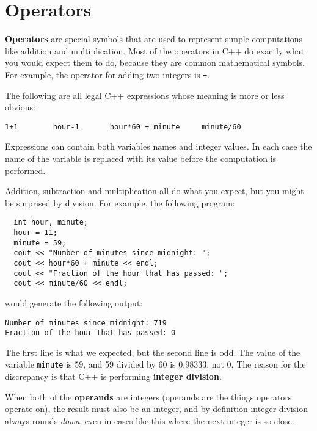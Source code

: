 \section{Operators}

{\bf Operators} are special symbols that are used to represent
simple computations like addition and multiplication.  Most
of the operators in C++ do exactly what you would expect them
to do, because they are common mathematical symbols.  For
example, the operator for adding two integers is {\tt +}.

The following are all legal C++ expressions whose meaning is
more or less obvious:

\begin{verbatim}
1+1        hour-1       hour*60 + minute     minute/60
\end{verbatim}
%
Expressions can contain both variables
names and integer values.  In each case the name of the variable is
replaced with its value before the computation is performed.


Addition, subtraction and multiplication all do what you
expect, but you might be surprised by division.  For example,
the following program:

\begin{verbatim}
  int hour, minute;
  hour = 11;
  minute = 59;
  cout << "Number of minutes since midnight: ";
  cout << hour*60 + minute << endl;
  cout << "Fraction of the hour that has passed: ";
  cout << minute/60 << endl;
\end{verbatim}
%
would generate the following output:

\begin{verbatim}
Number of minutes since midnight: 719
Fraction of the hour that has passed: 0
\end{verbatim}
%
The first line is what we expected, but the second line is
odd.  The value of the variable {\tt minute} is 59, and
59 divided by 60 is 0.98333, not 0.  The reason for the
discrepancy is that C++ is performing {\bf integer division}.


When both of the {\bf operands} are integers (operands are the things
operators operate on), the result must also be an integer,
and by definition integer division always rounds {\em down},
even in cases like this where the next integer is so close.

